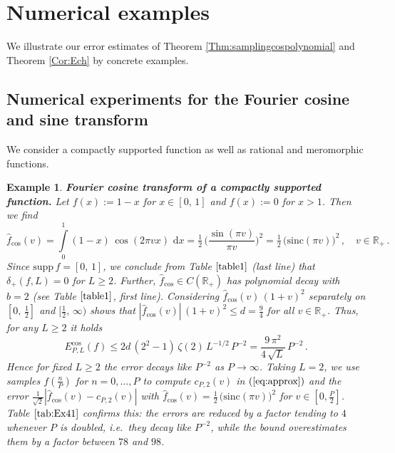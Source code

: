 \documentclass[11pt,a4paper]{scrartcl}
\renewcommand{\d}{\,\mathrm{d}}
\newtheorem{example}[theorem]{Example}
\numberwithin{equation}{section}
\numberwithin{table}{section}
\numberwithin{figure}{section}
\newcommand{\sinc}{\mathrm{sinc}}
\newcommand{\Rp}{{\mathbb R}_{+}}
\newcommand{\fcos}{{\hat f}_{\cos}}
\newcommand{\Ecos}{E^{\cos}}
\begin{document}
\section{Numerical examples\label{sec:numerics}}

We illustrate our error estimates of Theorem \ref{Thm:samplingcospolynomial} and Theorem \ref{Cor:Ech} by concrete examples.

\subsection{Numerical experiments for the Fourier cosine and sine transform}

We consider a compactly supported function as well as rational and meromorphic functions.

\begin{example} \textbf{Fourier cosine transform of a compactly supported function.}
	\label{Ex:M2}
	Let $f(x) := 1 - x$ for $x \in [0,\,1]$ and $f(x) := 0$ for $x > 1$.
		Then we find
	$$
	 \textstyle \fcos(v) = \int\limits_0^1 (1 - x)\,\cos(2\pi v x)\,\d x
	=\tfrac{1}{2}\,\big( \frac{\sin(\pi v)}{\pi v}\big)^2 =
	 \tfrac{1}{2}\,\big(\sinc(\pi v)\big)^2\,, \quad v \in \Rp\,.
	$$
	Since $\mathrm{supp}\,f = [0,\,1]$,
	we conclude from Table $\ref{table1}$ (last line) that
	$\delta_+(f,L) = 0$ for $L\ge 2$. Further,  $\fcos \in C(\Rp)$ has polynomial decay with
	$b = 2$ (see Table $\ref{table1}$, first line).
	 Considering  $\fcos(v)\,(1 + v)^2$ separately on $[0,\,\tfrac{1}{2}]$
	and $[\tfrac{1}{2},\,\infty)$ shows that $| \fcos(v)|\,(1 + v)^2  \le d =\tfrac{9}{4}$ for all $v \in \Rp$.
	Thus, for any $L \geq  2$ it holds
	$$
	 \textstyle \Ecos_{P,L}(f) \leq 2d\,(2^2 - 1)\,\zeta(2)\,L^{-1/2}\,P^{-2}
	= \frac{9\,\pi^2}{4\,\sqrt{L}}\,P^{-2}\,.
	$$
	Hence for fixed $L \geq 2$ the error decays like $P^{-2}$ as $P \to \infty$. Taking $L=2$, we use samples $f(\frac{n}{P})$ for $n=0, \ldots, P$ to compute $c_{P,2}(v)$ in $(\ref{eq:approx})$ and the error
	$\frac{1}{\sqrt{2}}|\fcos(v) - c_{P,2}(v)|$ with $\fcos(v)=\tfrac{1}{2}\,\big(\sinc(\pi v)\big)^2$ for $v \in [0,\frac{P}{2}]$.
	Table $\ref{tab:Ex41}$ confirms this: the errors are reduced by a factor tending to $4$ whenever
	$P$ is doubled, i.e.\ they decay like $P^{-2}$, while the bound overestimates them by a factor
	between $78$ and $98$.
\end{example}
\end{document}
